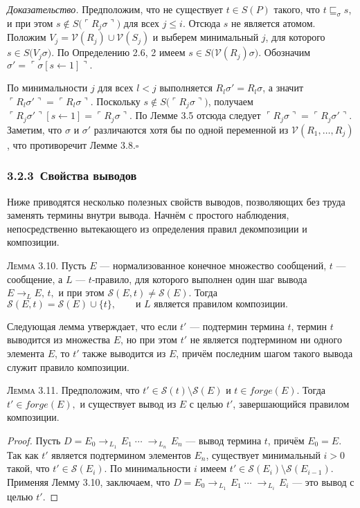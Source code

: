 \textit{Доказательство.}
Предположим, что не существует \(t\in S(P)\) такого, что
\(t\sqsubseteq_{\sigma}s\),
и при этом
\(s\notin S\!\bigl(\ulcorner R_j\sigma\urcorner\bigr)\)
для всех \(j\le i\).
Отсюда \(s\) не является атомом.
Положим
\(V_j=\mathcal V(R_j)\cup\mathcal V(S_j)\)
и выберем минимальный \(j\), для которого
\(s\in S\!\bigl(V_j\sigma\bigr)\).
По Определению 2.6, 2 имеем
\(s\in S\!\bigl(\mathcal V(R_j)\sigma\bigr)\).
Обозначим
\(
  \sigma'=\ulcorner \sigma[s\!\leftarrow\!1]\urcorner.
\)

По минимальности \(j\) для всех \(l<j\) выполняется
\(R_l\sigma'=R_l\sigma\),
а значит
\(
  \ulcorner R_l\sigma'\urcorner
  =
  \ulcorner R_l\sigma\urcorner.
\)
Поскольку
\(s\notin S\!\bigl(\ulcorner R_j\sigma\urcorner\bigr)\),
получаем
\(
  \ulcorner R_j\sigma'\urcorner[s\!\leftarrow\!1]
  =
  \ulcorner R_j\sigma\urcorner.
\)
По Лемме 3.5 отсюда следует
\(
  \ulcorner R_j\sigma\urcorner
  =
  \ulcorner R_j\sigma'\urcorner.
\)
Заметим, что \(\sigma\) и \(\sigma'\) различаются
хотя бы по одной переменной из
\(\mathcal V(R_1,\dots,R_j)\),
что противоречит Лемме 3.8.\hfill$\square$

\subsubsection*{3.2.3 \,Свойства выводов}
Ниже приводятся несколько полезных свойств выводов, 
позволяющих без труда заменять термины внутри вывода.
Начнём с простого наблюдения, непосредственно вытекающего
из определения правил декомпозиции и композиции.

\textsc{Лемма 3.10.}
Пусть $E$ — нормализованное конечное множество сообщений,
$t$ — сообщение,
а $L$ — $t$-правило, для которого выполнен один шаг вывода
\(
  E \rightarrow_{L} E,\,t,
\)
и при этом $\mathcal S(E,t)\ne \mathcal S(E)$.
Тогда
\(
  \mathcal S(E,t)=\mathcal S(E)\cup\{t\},
\qquad
  \text{и }L\text{ является правилом композиции.}
\)

Следующая лемма утверждает, что если
$t'$ — подтермин термина $t$,
термин $t$ выводится из множества $E$,
но при этом $t'$ не является подтермином ни одного элемента $E$,
то $t'$ также выводится из $E$, причём
последним шагом такого вывода служит правило композиции.

\textsc{Лемма 3.11.}
Предположим, что
$t'\in \mathcal S(t)\setminus \mathcal S(E)$
и
$t\in forge(E)$.
Тогда
\(
  t'\in forge(E),
\)
и существует вывод из $E$ с целью $t'$,
завершающийся правилом композиции.

\begin{proof}
Пусть
\(D=E_0 \rightarrow_{\,L_1\,} E_1 \;\cdots\; \rightarrow_{\,L_n\,} E_n\)
— вывод термина \(t\), причём \(E_0 = E\).
Так как \(t'\) является подтермином элементов \(E_n\),
существует минимальный \(i>0\) такой, что
\(t' \in \mathcal S(E_i)\).
По минимальности \(i\) имеем
\(t'\in \mathcal S(E_i)\setminus \mathcal S(E_{i-1})\).
Применяя Лемму 3.10, заключаем, что
\(D=E_0 \rightarrow_{\,L_1\,} E_1 \;\cdots\; \rightarrow_{\,L_i\,} E_i\)
— это вывод с целью \(t'\).
\end{proof}

